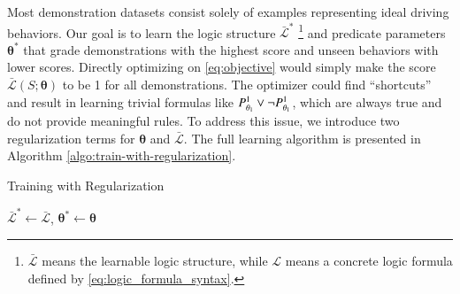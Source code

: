 Most demonstration datasets consist solely of examples representing ideal driving behaviors. Our goal is to learn the logic structure $\bar{\mathcal{L}}^*$ \footnote{$\bar{\mathcal{L}}$ means the learnable logic structure, while $\mathcal{L}$ means a concrete logic formula defined by \eqref{eq:logic_formula_syntax}. } and predicate parameters $\boldsymbol{\theta}^*$ that grade demonstrations with the highest score and unseen behaviors with lower scores. Directly optimizing on \eqref{eq:objective} would simply make the score $\bar{\mathcal{L}}(S; \boldsymbol{\theta})$ to be 1 for all demonstrations.
The optimizer could find ``shortcuts'' and result in learning trivial formulas like $P^{1}_{\theta_1} \lor \lnot P^{1}_{\theta_1}$, which are always true and do not provide meaningful rules.
To address this issue, we introduce two regularization terms for $\boldsymbol{\theta}$ and $\bar{\mathcal{L}}$. The full learning algorithm is presented in Algorithm \ref{algo:train-with-regularization}.
\begin{algorithm}[ht]
    \caption{Training with Regularization}
    \label{algo:train-with-regularization}




    \Return $\bar{\mathcal{L}}^* \leftarrow \bar{\mathcal{L}}$, $\boldsymbol{\theta}^* \leftarrow \boldsymbol{\theta}$
\end{algorithm}


